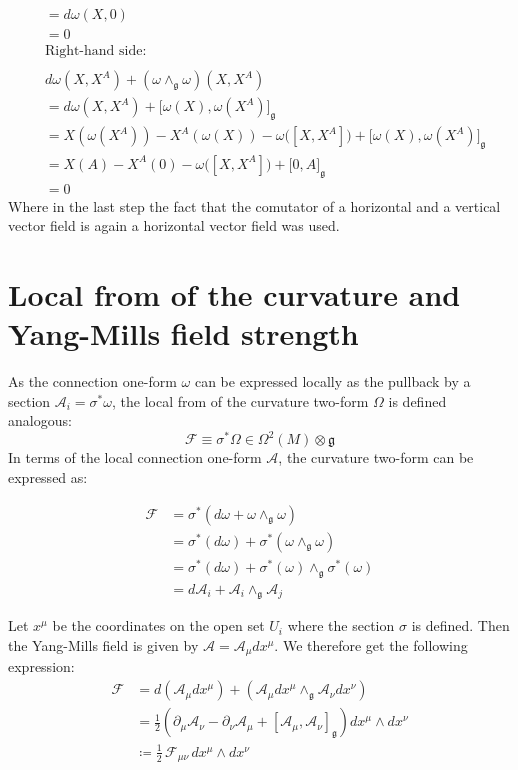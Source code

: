 \begin{align*}
  &= d\omega(X, 0) \\
  &= 0 \\
    &\text{Right-hand side:} \\
    \\
  &d\omega(X,X^A) + (\omega \wedge_{\mathfrak{g}} \omega)(X,X^A) \\
  &= d\omega(X, X^A) + \big[ \omega(X), \omega(X^A) \big]_\mathfrak{g} \\
  &= X(\omega(X^A)) - X^A(\omega(X)) - \omega\big( [X,X^A] \big) + \big[ \omega(X), \omega(X^A) \big]_\mathfrak{g} \\
  &= X(A) - X^A(0) - \omega\big( [X,X^A] \big) + \big[ 0, A \big]_\mathfrak{g} \\
  &= 0
\end{align*}
Where in the last step the fact that the comutator of a horizontal and a vertical vector field is again a horizontal vector field was used\cite{NakaharaGeometrytopologyphysics2005}.


\section{Local from of the curvature and Yang-Mills field strength}

As the connection one-form $\omega$ can be expressed locally as the pullback by a section $\mathcal{A}_i = \sigma^*\omega$, the local from of the curvature two-form $\Omega$ is defined analogous\cite{NakaharaGeometrytopologyphysics2005}:
\[ \mathscr{F} \equiv \sigma^*\Omega \in \Omega^2(M)\otimes\mathfrak{g} \]
In terms of the local connection one-form $\mathcal{A}$, the curvature two-form can be expressed as:

\begin{align*}
  \mathscr{F} &= \sigma^*(d\omega + \omega \wedge_\mathfrak{g} \omega) \\
  &= \sigma^*(d\omega) + \sigma^*(\omega \wedge_\mathfrak{g} \omega) \\
  &= \sigma^*(d\omega) + \sigma^*(\omega) \wedge_\mathfrak{g} \sigma^*(\omega) \\
  &= d\mathcal{A}_i + \mathcal{A}_i \wedge_\mathfrak{g} \mathcal{A}_j
\end{align*}

Let $x^\mu$ be the coordinates on the open set $U_i$ where the section $\sigma$ is defined. Then the Yang-Mills field is given by $\mathcal{A}=\mathcal{A}_\mu dx^\mu$. We therefore get the following expression:
\begin{align*}
  \mathscr{F} &= d(\mathcal{A}_\mu dx^\mu) + (\mathcal{A}_\mu dx^\mu \wedge_\mathfrak{g} \mathcal{A}_\nu dx^\nu) \\
  &= \frac12 \left( \partial_\mu \mathcal{A}_\nu - \partial_\nu \mathcal{A}_\mu + [\mathcal{A}_\mu, \mathcal{A}_\nu]_\mathfrak{g} \right) dx^\mu \wedge dx^\nu \\
  &\coloneq \frac12 \, \mathscr{F}_{\mu\nu} \, dx^\mu \wedge dx^\nu
\end{align*}

